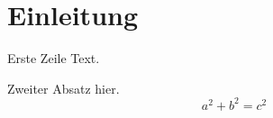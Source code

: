 \documentclass[a4paper]{article}
\begin{document}
\section{Einleitung}
Erste Zeile Text.

Zweiter Absatz hier.
\[ a^2 + b^2 = c^2 \]
\foo
\end{document}
